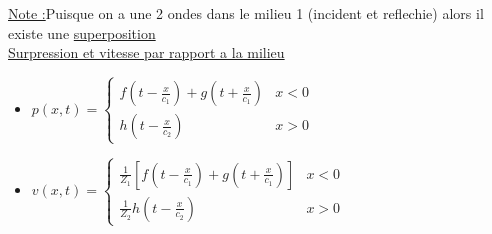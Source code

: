 \documentclass[12pt]{book}
\begin{document}
            \underline{Note :}Puisque on a une 2 ondes dans le milieu 1 (incident et reflechie) alors il existe une \underline{superposition} \\ 
            \underline{Surpression et vitesse par rapport a la milieu}
            \begin{itemize}
                \item $ p(x,t)=\begin{cases}
                    f(t-\frac{x}{c_1})+g(t+\frac{x}{c_1}) & x<0 \\
                    h(t-\frac{x}{c_2}) & x>0 
                \end{cases}$
                \item $ v(x,t)=\begin{cases}
                    \frac{1}{Z_1}[f(t-\frac{x}{c_1})+g(t+\frac{x}{c_1})] & x<0 \\
                    \frac{1}{Z_2}h(t-\frac{x}{c_2}) & x>0 
                \end{cases}$
            \end{itemize}


            
\end{document}
